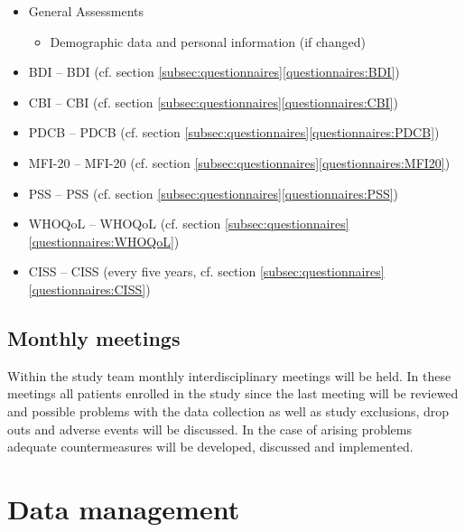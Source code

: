 \begin{itemize}[noitemsep,topsep=0pt]
\item General Assessments
\begin{itemize}[noitemsep,topsep=0pt]
\item Demographic data and personal information (if changed)
\end{itemize}
\item \acl{BDI} -- \acs{BDI} (cf. section \ref{subsec:questionnaires}\ref{questionnaires:BDI})
\item \acl{CBI} -- \acs{CBI} (cf. section \ref{subsec:questionnaires}\ref{questionnaires:CBI})
\item \acl{PDCB} -- \acs{PDCB} (cf. section \ref{subsec:questionnaires}\ref{questionnaires:PDCB})
\item \acl{MFI-20} -- \acs{MFI-20} (cf. section \ref{subsec:questionnaires}\ref{questionnaires:MFI20})
\item \acl{PSS} -- \acs{PSS} (cf. section \ref{subsec:questionnaires}\ref{questionnaires:PSS})
\item \acl{WHOQoL} -- \acs{WHOQoL} (cf. section \ref{subsec:questionnaires}\ref{questionnaires:WHOQoL})
\item \acl{CISS} -- \acs{CISS} (every five years, cf. section \ref{subsec:questionnaires}\ref{questionnaires:CISS})
\end{itemize}

\subsection{Monthly meetings}
Within the study team monthly interdisciplinary meetings will be held. In these meetings all patients enrolled in the study since the last meeting will be reviewed and possible problems with the data collection as well as study exclusions, drop outs and adverse events will be discussed. In the case of arising problems adequate countermeasures will be developed, discussed and implemented.

\section{Data management}
